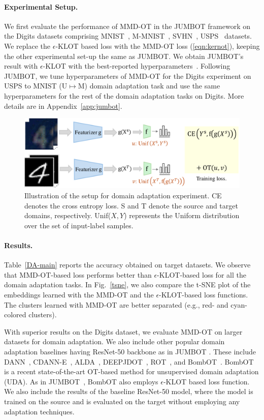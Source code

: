 \paragraph{Experimental Setup.} We first evaluate the performance of MMD-OT in the JUMBOT framework on the Digits datasets comprising MNIST~\citep{lecun-mnisthandwrittendigit-2010}, M-MNIST~\citep{mmnist-ganin2016domain}, SVHN~\citep{svhn}, USPS~\citep{usps} datasets. We replace the $\epsilon$-KLOT based loss with the MMD-OT loss (\ref{eqn:kernot}), keeping the other experimental set-up the same as JUMBOT. We obtain JUMBOT's result with $\epsilon$-KLOT with the best-reported hyperparameters~\citep{jumbot}. Following JUMBOT, we tune hyperparameters of MMD-OT for the Digits experiment on USPS to MNIST (U$\mapsto$M) domain adaptation task and use the same hyperparameters for the rest of the domain adaptation tasks on Digits. More details are in Appendix~\ref{app:jumbot}. 
\begin{figure}[t]
    \centering
    \includegraphics[width=0.8\linewidth]{chapter-1/images/UDA-illus.pdf}
    \caption[Illustration of the setup for domain adaptation experiment.]{Illustration of the setup for domain adaptation experiment. CE denotes the cross entropy loss. S and T denote the source and target domains, respectively. Unif($X, Y$) represents the Uniform distribution over the set of input-label samples.}
    \label{fig:UDA-illus}
\end{figure}
\paragraph{Results.} Table~\ref{DA-main} reports the accuracy obtained on target datasets. We observe that MMD-OT-based loss performs better than $\epsilon$-KLOT-based loss for all the domain adaptation tasks. In Fig.~\ref{tsne}, we also compare the t-SNE plot of the embeddings learned with the MMD-OT and the $\epsilon$-KLOT-based loss functions. The clusters learned with  MMD-OT are better separated (e.g., red- and cyan-colored clusters).


With superior results on the Digits dataset, we evaluate MMD-OT on larger datasets for domain adaptation. We also include other popular domain adaptation baselines having ResNet-50 backbone as in JUMBOT \citep{jumbot}. These include DANN~\citep{mmnist-ganin2016domain}, CDANN-E~\citep{Long2017ConditionalAD}, 
ALDA~\citep{Chen2020AdversarialLearnedLF},
DEEPJDOT~\citep{damodaran2018deepjdot}, ROT~\citep{ROT}, and BombOT~\citep{bomb-ot}. BombOT is a recent state-of-the-art OT-based method for unsupervised domain adaptation (UDA). As in JUMBOT~\citep{jumbot}, BombOT also employs $\epsilon$-KLOT based loss function. 
We also include the results of the baseline ResNet-50 model, where the model is trained on the source and is evaluated on the target without employing any adaptation techniques.

